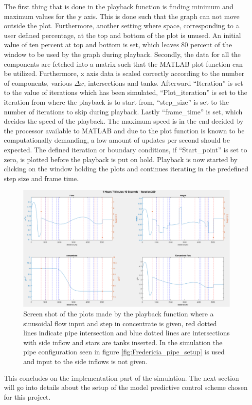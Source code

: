 The first thing that is done in the playback function is finding minimum and maximum values for the y axis. This is done such that the graph can not move outside the plot. Furthermore, another setting where space, corresponding to a user defined percentage, at the top and bottom of the plot is unused. An initial value of ten percent at top and bottom is set, which leaves 80 percent of the window to be used by the graph during playback.  
Secondly, the data for all the components are fetched into a matrix such that the MATLAB plot function can be utilized. Furthermore, x axis data is scaled correctly according to the number of components, various $\Delta x$, intersections and tanks. Afterward ``Iteration'' is set to the value of iterations which has been simulated, ``Plot\_iteration'' is set to the iteration from where the playback is to start from, ``step\_size'' is set to the number of iterations to skip during playback. Lastly ``frame\_time'' is set, which decides the speed of the playback. The maximum speed is in the end decided by the processor available to MATLAB and due to the plot function is known to be computationally demanding, a low amount of updates per second should be expected. The defined iteration or boundary conditions, if ``Start\_point'' is set to zero, is plotted before the playback is put on hold. Playback is now started by clicking on the window holding the plots and continues iterating in the predefined step size and frame time.


 \begin{figure}
 \centering
 \includegraphics[width=1.0 \textwidth]{report/simulation/pictures/display_result_matlab.png}
 \caption{Screen shot of the plots made by the playback function where a sinusoidal flow input and step in concentrate is given, red dotted lines indicate pipe intersection and blue dotted lines are intersections with side inflow and stars are tanks inserted. In the simulation the pipe configuration seen in figure \ref{fig:Fredericia_pipe_setup} is used and input to the side inflows is not given.}
 \label{fig:display_result_matlab}
 \end{figure}

This concludes on the implementation part of the simulation. The next section will go into details about the setup of the model predictive control scheme chosen for this project.